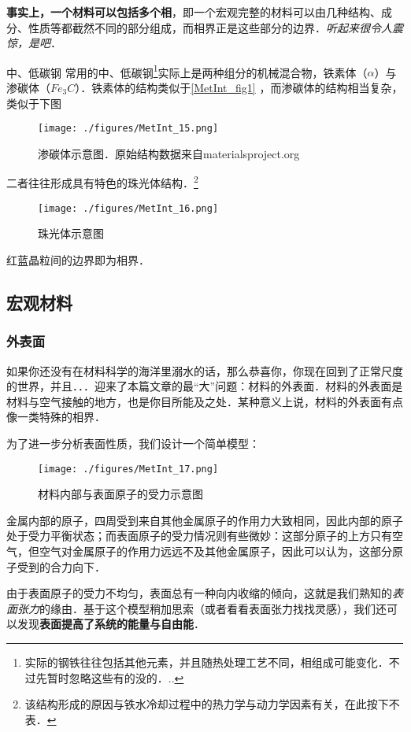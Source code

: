 \textbf{事实上，一个材料可以包括多个相}，即一个宏观完整的材料可以由几种结构、成分、性质等都截然不同的部分组成，而相界正是这些部分的边界．\textsl{听起来很令人震惊，是吧}．

\begin{example}{中、低碳钢}
常用的中、低碳钢\footnote{实际的钢铁往往包括其他元素，并且随热处理工艺不同，相组成可能变化．不过先暂时忽略这些有的没的．..}实际上是两种组分的机械混合物，铁素体（$\alpha$）与渗碳体（$Fe_3C$）．铁素体的结构类似于\autoref{MetInt_fig1} ，而渗碳体的结构相当复杂，类似于下图
\begin{figure}[ht]
\centering
\texttt{[image: ./figures/MetInt\_15.png]}
\caption{渗碳体示意图．原始结构数据来自materialsproject.org} \label{MetInt_fig15}
\end{figure}
二者往往形成具有特色的珠光体结构．\footnote{该结构形成的原因与铁水冷却过程中的热力学与动力学因素有关，在此按下不表．}
\begin{figure}[ht]
\centering
\texttt{[image: ./figures/MetInt\_16.png]}
\caption{珠光体示意图} \label{MetInt_fig16}
\end{figure}
红蓝晶粒间的边界即为相界．
\end{example}

\subsection{宏观材料}
\subsubsection{外表面}
如果你还没有在材料科学的海洋里溺水的话，那么恭喜你，你现在回到了正常尺度的世界，并且．．．迎来了本篇文章的最“大”问题：材料的外表面．材料的外表面是材料与空气接触的地方，也是你目所能及之处．某种意义上说，材料的外表面有点像一类特殊的相界．

为了进一步分析表面性质，我们设计一个简单模型：
\begin{figure}[ht]
\centering
\texttt{[image: ./figures/MetInt\_17.png]}
\caption{材料内部与表面原子的受力示意图} \label{MetInt_fig17}
\end{figure}
金属内部的原子，四周受到来自其他金属原子的作用力大致相同，因此内部的原子处于受力平衡状态；而表面原子的受力情况则有些微妙：这部分原子的上方只有空气，但空气对金属原子的作用力远远不及其他金属原子，因此可以认为，这部分原子受到的合力向下．

由于表面原子的受力不均匀，表面总有一种向内收缩的倾向，这就是我们熟知的\textsl{表面张力}的缘由．基于这个模型稍加思索（或者看看表面张力找找灵感），我们还可以发现\textbf{表面提高了系统的能量与自由能}．

